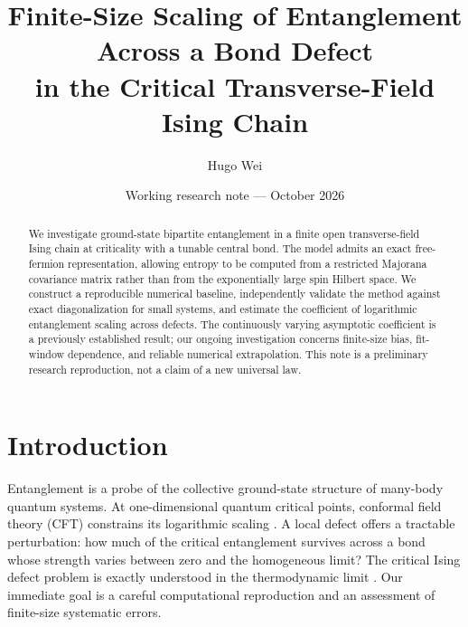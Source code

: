 \documentclass[11pt,a4paper]{article}
\title{Finite-Size Scaling of Entanglement Across a Bond Defect\\
in the Critical Transverse-Field Ising Chain}
\author{Hugo Wei}
\date{Working research note --- October 2026}
\begin{document}
\maketitle

\begin{abstract}
We investigate ground-state bipartite entanglement in a finite open
transverse-field Ising chain at criticality with a tunable central bond.
The model admits an exact free-fermion representation, allowing entropy
to be computed from a restricted Majorana covariance matrix rather
than from the exponentially large spin Hilbert space. We construct a
reproducible numerical baseline, independently validate the method
against exact diagonalization for small systems, and estimate the
coefficient of logarithmic entanglement scaling across defects.
The continuously varying asymptotic coefficient is a previously
established result; our ongoing investigation concerns finite-size
bias, fit-window dependence, and reliable numerical extrapolation.
This note is a preliminary research reproduction, not a claim of a
new universal law.
\end{abstract}

\section{Introduction}
Entanglement is a probe of the collective ground-state structure of
many-body quantum systems. At one-dimensional quantum critical points,
conformal field theory (CFT) constrains its logarithmic scaling
\cite{CalabreseCardy2004}. A local defect offers a tractable
perturbation: how much of the critical entanglement survives across
a bond whose strength varies between zero and the homogeneous limit?
The critical Ising defect problem is exactly understood in the
thermodynamic limit \cite{EislerPeschel2010}. Our immediate goal is a
careful computational reproduction and an assessment of finite-size
systematic errors.
\end{document}
